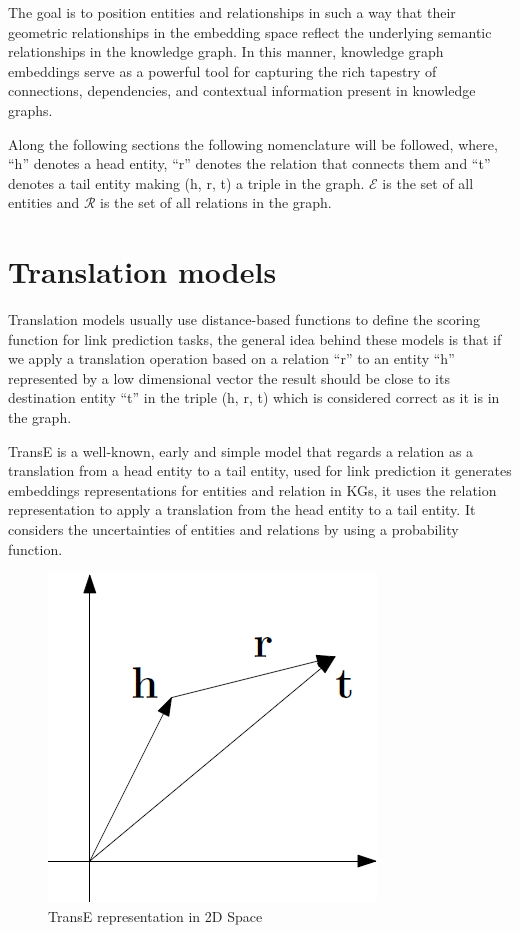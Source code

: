 The goal is to position entities and relationships in such a way that their geometric relationships in the embedding space reflect the underlying semantic relationships in the knowledge graph. In this manner, knowledge graph embeddings serve as a powerful tool for capturing the rich tapestry of connections, dependencies, and contextual information present in knowledge graphs.

Along the following sections the following nomenclature will be followed, where, ``h'' denotes a head entity, ``r'' denotes the relation that connects them and ``t'' denotes a tail entity making (h, r, t) a triple in the graph. $\mathcal{E}$ is the set of all entities and $\mathcal{R}$ is the set of all relations in the graph.

\section{Translation models}\label{sec:emb-translations}


Translation models usually use distance-based functions to define the scoring function for link prediction tasks, the general idea behind these models is that if we apply a translation operation based on a relation ``r'' to an entity ``h'' represented by a low dimensional vector the result should be close to its destination entity ``t'' in the triple (h, r, t) which is considered correct as it is in the graph.

TransE \cite{} is a well-known, early and simple model that regards a relation as a translation from a head entity to a tail entity, used for link prediction it generates embeddings representations for entities and relation in KGs, it uses the relation representation to apply a translation from the head entity to a tail entity. It considers the uncertainties of entities and relations by using a probability function. 

\begin{figure}[!htp]
    \centering
    \includegraphics[width=.4\textwidth]{fig/embeddings/TransE.png}
    \caption{TransE representation in 2D Space}
    \label{fig:emb-transE}
\end{figure}

